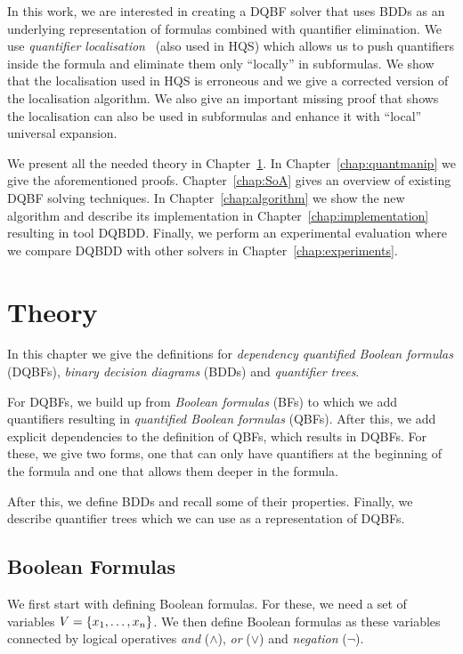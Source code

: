 \documentclass[
  digital, %
  color,
  twoside, %
  table,   %
  nolof,     %
  nolot,     %
]{fithesis3}
\let\setbuilder\set
\newcommand{\simpleset}[1]{\{{#1}\}}
\renewcommand{\set}[1]{\normalexpandarg\IfSubStr{#1}{|}{\setbuilder{#1}}{\simpleset{#1}}}
\theoremstyle{definition}
\theoremstyle{remark}
\begin{document}
In this work, we are interested in creating a DQBF solver that uses BDDs as an underlying representation of formulas combined with quantifier elimination. We use \emph{quantifier localisation}~\cite{HQSquantifierLocalisation} (also used in HQS) which allows us to push quantifiers inside the formula and eliminate them only ``locally'' in subformulas. We show that the localisation used in HQS is erroneous and we give a corrected version of the localisation algorithm. We also give an important missing proof that shows the localisation can also be used in subformulas and enhance it with ``local'' universal expansion. 

We present all the needed theory in Chapter~\ref{chap:theory}. In Chapter~\ref{chap:quantmanip} we give the aforementioned proofs.
Chapter~\ref{chap:SoA} gives an overview of existing DQBF solving techniques. In Chapter~\ref{chap:algorithm} we show the new algorithm and describe its implementation in Chapter~\ref{chap:implementation} resulting in tool DQBDD. Finally, we perform an experimental evaluation where we compare DQBDD with other solvers in Chapter~\ref{chap:experiments}.

\chapter{Theory}
\label{chap:theory}
In this chapter we give the definitions for \emph{dependency quantified Boolean formulas} (DQBFs), \emph{binary decision diagrams} (BDDs) and \emph{quantifier trees}.

For DQBFs, we build up from \emph{Boolean formulas} (BFs) to which we add quantifiers resulting in \emph{quantified Boolean formulas} (QBFs). After this, we add explicit dependencies to the definition of QBFs, which results in DQBFs. For these, we give two forms, one that can only have quantifiers at the beginning of the formula and one that allows them deeper in the formula.

After this, we define BDDs and recall some of their properties. Finally, we describe quantifier trees which we can use as a representation of DQBFs.

\section{Boolean Formulas}
We first start with defining Boolean formulas. For these, we need a set of variables $V = \set{x_1, \dots, x_n}$. We then define Boolean formulas as these variables connected by logical operatives \emph{and} (${\land}$), \emph{or} (${\lor}$) and \emph{negation} (${\neg}$).
\end{document}
